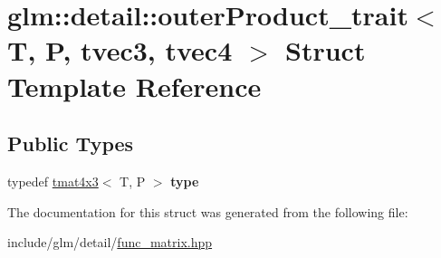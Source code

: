 \hypertarget{structglm_1_1detail_1_1outerProduct__trait_3_01T_00_01P_00_01tvec3_00_01tvec4_01_4}{}\section{glm\+:\+:detail\+:\+:outer\+Product\+\_\+trait$<$ T, P, tvec3, tvec4 $>$ Struct Template Reference}
\label{structglm_1_1detail_1_1outerProduct__trait_3_01T_00_01P_00_01tvec3_00_01tvec4_01_4}
\subsection*{Public Types}
\begin{DoxyCompactItemize}
\item 
\mbox{\label{structglm_1_1detail_1_1outerProduct__trait_3_01T_00_01P_00_01tvec3_00_01tvec4_01_4_ad7ef7d688ded0e316f8b5702a834a68f}} 
typedef \hyperlink{structglm_1_1tmat4x3}{tmat4x3}$<$ T, P $>$ {\bfseries type}
\end{DoxyCompactItemize}


The documentation for this struct was generated from the following file\+:\begin{DoxyCompactItemize}
\item 
include/glm/detail/\hyperlink{func__matrix_8hpp}{func\+\_\+matrix.\+hpp}\end{DoxyCompactItemize}
